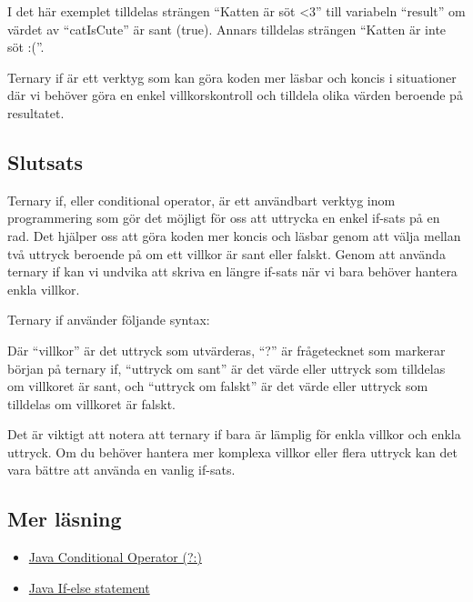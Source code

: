 I det här exemplet tilldelas strängen ``Katten är söt \textless3'' till
variabeln ``result'' om värdet av ``catIsCute'' är sant (true). Annars
tilldelas strängen ``Katten är inte söt :(''.

Ternary if är ett verktyg som kan göra koden mer läsbar och koncis i
situationer där vi behöver göra en enkel villkorskontroll och tilldela
olika värden beroende på resultatet.

\hypertarget{slutsats}{%
\subsection{Slutsats}\label{slutsats}}

Ternary if, eller conditional operator, är ett användbart verktyg inom
programmering som gör det möjligt för oss att uttrycka en enkel if-sats
på en rad. Det hjälper oss att göra koden mer koncis och läsbar genom
att välja mellan två uttryck beroende på om ett villkor är sant eller
falskt. Genom att använda ternary if kan vi undvika att skriva en längre
if-sats när vi bara behöver hantera enkla villkor.

Ternary if använder följande syntax:

\hypertarget{cb3}{}
\begin{Shaded}
\begin{Highlighting}[]
\OperatorTok{:}
\end{Highlighting}
\end{Shaded}

Där ``villkor'' är det uttryck som utvärderas, ``?'' är frågetecknet som
markerar början på ternary if, ``uttryck om sant'' är det värde eller
uttryck som tilldelas om villkoret är sant, och ``uttryck om falskt'' är
det värde eller uttryck som tilldelas om villkoret är falskt.

Det är viktigt att notera att ternary if bara är lämplig för enkla
villkor och enkla uttryck. Om du behöver hantera mer komplexa villkor
eller flera uttryck kan det vara bättre att använda en vanlig if-sats.

\hypertarget{mer-luxe4sning}{%
\subsection{Mer läsning}\label{mer-luxe4sning}}

\begin{itemize}
\tightlist
\item
  \href{https://docs.oracle.com/en/java/javase/14/docs/api/java.base/java/lang/ConditionalOperator.html}{Java
  Conditional Operator (?:)}
\item
  \href{https://docs.oracle.com/en/java/javase/14/docs/api/java.base/java/lang/IfStatement.html}{Java
  If-else statement}
\end{itemize}


